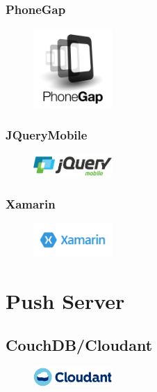 \begin{figure}
\subsubsection{PhoneGap}
\begin{figure}
\includegraphics[width=3cm]{img/mobile-app/logos/PhoneGap.png}
\end{figure} 

\subsubsection{JQueryMobile}
\begin{figure}
\includegraphics[width=3cm]{img/mobile-app/logos/jquery-mobile.png}
\end{figure} 

\subsubsection{Xamarin}
\begin{figure}
\includegraphics[width=3cm]{img/mobile-app/logos/xamarin.png}
\end{figure} 

  \section{Push Server}

\subsection{CouchDB/Cloudant}
\begin{figure}
\includegraphics[width=3cm]{img/mobile-app/logos/cloudant.jpg}
\end{figure} 


\end{figure}
